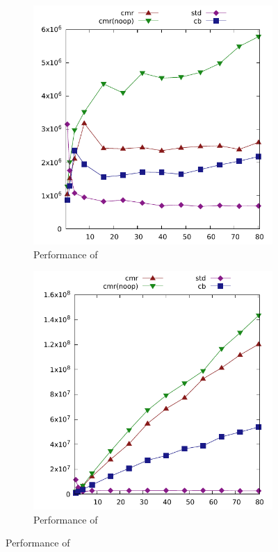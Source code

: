 \begin{figure}[ht]
\centering
  \begin{subfigure}{0.49\linewidth}
    \includegraphics[width=\linewidth]{graphs/eecs-ath-16-hm-insert.pdf}
    \caption{Performance of }
  \end{subfigure}
  \begin{subfigure}{0.49\linewidth}
    \includegraphics[width=\linewidth]{graphs/eecs-ath-16-hm-contains.pdf}
    \caption{Performance of }
  \end{subfigure}
\end{figure}

